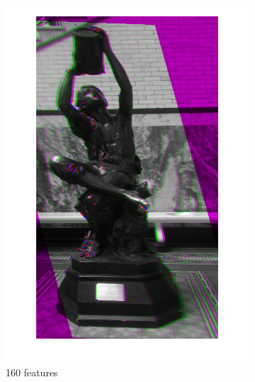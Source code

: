 \documentclass{article}
\begin{document}
\begin{figure}[h]
   	\begin{subfigure}[b]{0.3\textwidth}
    	\centering
    	\includegraphics[width=\textwidth]{figures/alignment/fused_160_features_16_iterations}
    	\caption{160 features}
    \end{subfigure}
    \begin{subfigure}[b]{0.3\textwidth}
    	\centering

\end{subfigure}
\end{figure}
\end{document}
